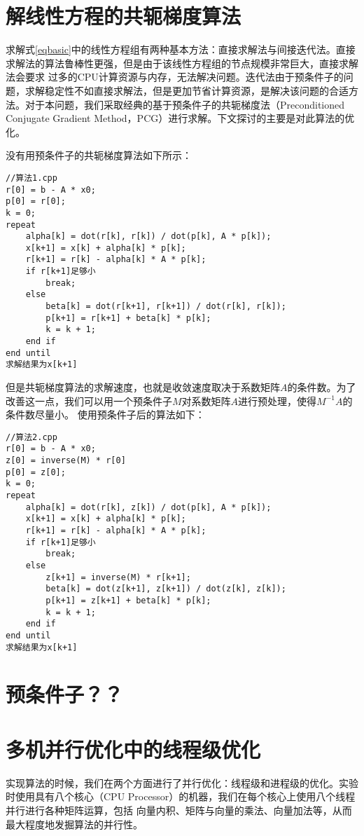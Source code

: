 \section{解线性方程的共轭梯度算法}

求解式\ref{eqbasic}中的线性方程组有两种基本方法：直接求解法与间接迭代法。直接求解法的算法鲁棒性更强，但是由于该线性方程组的节点规模非常巨大，直接求解法会要求
过多的CPU计算资源与内存，无法解决问题。迭代法由于预条件子的问题，求解稳定性不如直接求解法，但是更加节省计算资源，是解决该问题的合适方法。对于本问题，我们采取经典的基于预条件子的共轭梯度法（Preconditioned Conjugate Gradient Method，PCG）进行求解。下文探讨的主要是对此算法的优化。

没有用预条件子的共轭梯度算法如下所示：
\begin{lstlisting}
//算法1.cpp
r[0] = b - A * x0;
p[0] = r[0];
k = 0;
repeat
    alpha[k] = dot(r[k], r[k]) / dot(p[k], A * p[k]);
    x[k+1] = x[k] + alpha[k] * p[k];
    r[k+1] = r[k] - alpha[k] * A * p[k];
    if r[k+1]足够小
        break;
    else
        beta[k] = dot(r[k+1], r[k+1]) / dot(r[k], r[k]);
        p[k+1] = r[k+1] + beta[k] * p[k];
        k = k + 1;
    end if
end until
求解结果为x[k+1]
\end{lstlisting}

但是共轭梯度算法的求解速度，也就是收敛速度取决于系数矩阵$A$的条件数。为了改善这一点，我们可以用一个预条件子$M$对系数矩阵$A$进行预处理，使得$M^{-1}A$的条件数尽量小。
使用预条件子后的算法如下：
\begin{lstlisting}
//算法2.cpp
r[0] = b - A * x0;
z[0] = inverse(M) * r[0]
p[0] = z[0];
k = 0;
repeat
    alpha[k] = dot(r[k], z[k]) / dot(p[k], A * p[k]);
    x[k+1] = x[k] + alpha[k] * p[k];
    r[k+1] = r[k] - alpha[k] * A * p[k];
    if r[k+1]足够小
        break;
    else
        z[k+1] = inverse(M) * r[k+1];
        beta[k] = dot(z[k+1], z[k+1]) / dot(z[k], z[k]);
        p[k+1] = z[k+1] + beta[k] * p[k];
        k = k + 1;
    end if
end until
求解结果为x[k+1]
\end{lstlisting}

\section{预条件子？？}

\section{多机并行优化中的线程级优化}

实现算法的时候，我们在两个方面进行了并行优化：线程级和进程级的优化。实验时使用具有八个核心（CPU Processor）的机器，我们在每个核心上使用八个线程并行进行各种矩阵运算，包括
向量内积、矩阵与向量的乘法、向量加法等，从而最大程度地发掘算法的并行性。

